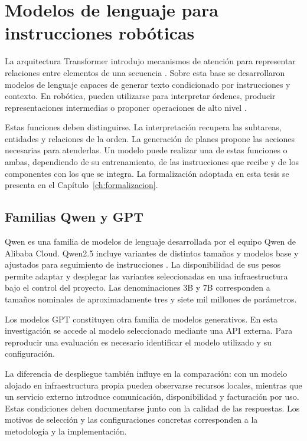 \section{Modelos de lenguaje para instrucciones robóticas}
\label{sec:modelos-lenguaje}

La arquitectura Transformer introdujo mecanismos de atención para representar relaciones entre elementos de una secuencia \cite{Vaswani2017}. Sobre esta base se desarrollaron modelos de lenguaje capaces de generar texto condicionado por instrucciones y contexto. En robótica, pueden utilizarse para interpretar órdenes, producir representaciones intermedias o proponer operaciones de alto nivel \cite{Shi2023}.

Estas funciones deben distinguirse. La interpretación recupera las subtareas, entidades y relaciones de la orden. La generación de planes propone las acciones necesarias para atenderlas. Un modelo puede realizar una de estas funciones o ambas, dependiendo de su entrenamiento, de las instrucciones que recibe y de los componentes con los que se integra. La formalización adoptada en esta tesis se presenta en el Capítulo~\ref{ch:formalizacion}.

\subsection{Familias Qwen y GPT}

Qwen es una familia de modelos de lenguaje desarrollada por el equipo Qwen de Alibaba Cloud. Qwen2.5 incluye variantes de distintos tamaños y modelos base y ajustados para seguimiento de instrucciones \cite{yang2024qwen25}. La disponibilidad de sus pesos permite adaptar y desplegar las variantes seleccionadas en una infraestructura bajo el control del proyecto. Las denominaciones 3B y 7B corresponden a tamaños nominales de aproximadamente tres y siete mil millones de parámetros.

Los modelos GPT constituyen otra familia de modelos generativos. En esta investigación se accede al modelo seleccionado mediante una API externa. Para reproducir una evaluación es necesario identificar el modelo utilizado y su configuración.

La diferencia de despliegue también influye en la comparación: con un modelo alojado en infraestructura propia pueden observarse recursos locales, mientras que un servicio externo introduce comunicación, disponibilidad y facturación por uso. Estas condiciones deben documentarse junto con la calidad de las respuestas. Los motivos de selección y las configuraciones concretas corresponden a la metodología y la implementación.

